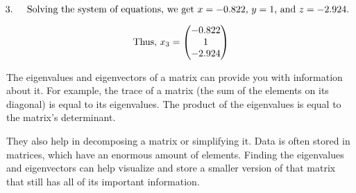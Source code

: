 \documentclass{article}
\begin{document}
\[
\text{\hspace{-4mm} 3. \hspace{2mm} Solving the system of equations, we get \( x = -0.822 \), \( y = 1 \), and \( z = -2.924 \).}
\]

\[
\text{Thus, \( x_3 = \begin{pmatrix} -0.822 \\ 1 \\ -2.924 \end{pmatrix} \)}
\]

\vspace{1mm}

The eigenvalues and eigenvectors of a matrix can provide you with information about it. For example, the trace of a matrix (the sum of the elements on its diagonal) is equal to its eigenvalues. The product of the eigenvalues is equal to the matrix's determinant.

\vspace{1mm}

They also help in decomposing a matrix or simplifying it. Data is often stored in matrices, which have an enormous amount of elements. Finding the eigenvalues and eigenvectors can help visualize and store a smaller version of that matrix that still has all of its important information.
\end{document}
